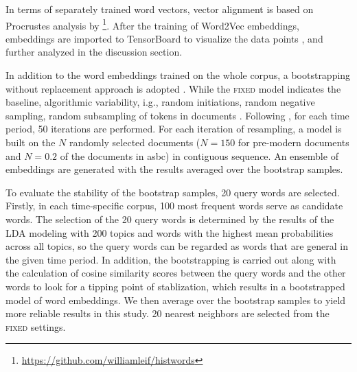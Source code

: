 In terms of separately trained word vectors, vector alignment is based on Procrustes analysis by \textcite{hamilton2016law}\footnote{\url{https://github.com/williamleif/histwords}}. After the training of Word2Vec embeddings, embeddings are imported to TensorBoard to visualize the data points \parencite{smilkov2016projector}, and further analyzed in the discussion section.

In addition to the word embeddings trained on the whole corpus, a bootstrapping without replacement approach is adopted \parencite{antoniak2018evaluating}. While the \textsc{fixed} model indicates the baseline, algorithmic variability, i.g., random initiations, random negative sampling, random subsampling of tokens in documents \parencite{antoniak2018evaluating}. Following \textcite{antoniak2018evaluating}, for each time period, 50 iterations are performed. For each iteration of resampling, a model is built on the $N$ randomly selected documents ($N=150$ for pre-modern documents and $N=0.2$ of the documents in \gls{asbc}) in contiguous sequence. An ensemble of embeddings are generated with the results averaged over the bootstrap samples.

To evaluate the stability of the bootstrap samples, 20 query words are selected. Firstly, in each time-specific corpus, 100 most frequent words serve as candidate words. The selection of the 20 query words is determined by the results of the LDA modeling with 200 topics and words with the highest mean probabilities across all topics, so the query words can be regarded as words that are general in the given time period. In addition, the bootstrapping is carried out along with the calculation of cosine similarity scores between the query words and the other words to look for a tipping point of stablization, which results in a bootstrapped model of word embeddings. We then average over the bootstrap samples to yield more reliable results in this study. 20 nearest neighbors are selected from the \textsc{fixed} settings. 


